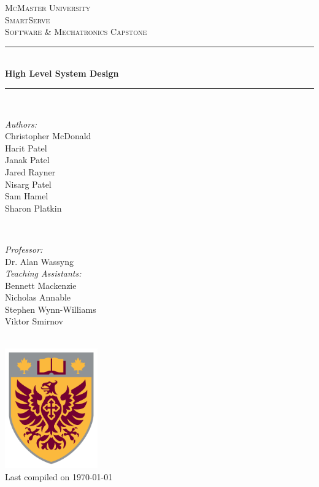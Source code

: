\documentclass[11pt]{article}
\begin{document}
\begin{titlepage}
	\newcommand{\HRule}{\rule{\linewidth}{0.2mm}}
	\begin{center}
	\textsc{\LARGE McMaster University}\\[1.5cm]

	\textsc{\Large SmartServe}\\[0.5cm]
	\textsc{\large Software \& Mechatronics Capstone}\\[0.5cm]

	\HRule\\[0.4cm]
		{\huge\bfseries High Level System Design}\\[0.4cm]
	\HRule\\[0.4cm]

	\begin{minipage}[t][][t]{0.5\textwidth}
		\begin{flushleft} \large
			\emph{Authors:}\\
			Christopher McDonald\\
			Harit Patel \\
			Janak Patel \\
			Jared Rayner  \\
			Nisarg Patel  \\
			Sam Hamel \\
			Sharon Platkin \\
		\end{flushleft}
	\end{minipage}
	~
	\begin{minipage}[t][][t]{0.4\textwidth}
		\begin{flushright} \large
			\emph{Professor:} \\
			Dr. Alan Wassyng \\[0.4cm]
			\emph{Teaching Assistants:} \\
			Bennett Mackenzie \\
			Nicholas Annable \\
			Stephen Wynn-Williams \\
			Viktor Smirnov
		\end{flushright}
	\end{minipage}\\[2cm]

	\includegraphics[width=0.3\textwidth]{logo.png} \\
	{\large Last compiled on \today}
	\end{center}

\end{titlepage}
\end{document}
